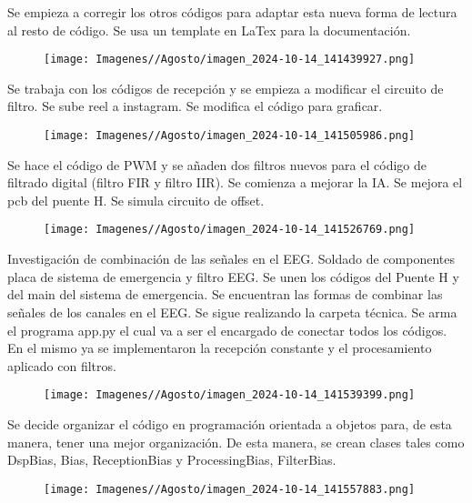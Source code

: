 \documentclass{article}
\begin{document}
\newpage
Se empieza a corregir los otros códigos para adaptar esta nueva forma de lectura al resto de código. Se usa un template en LaTex para la documentación.

\begin{figure}[H]
    \centering
    \texttt{[image: Imagenes//Agosto/imagen\_2024-10-14\_141439927.png]}
\end{figure}

Se trabaja con los códigos de recepción y se empieza a modificar el circuito de filtro. Se sube reel a instagram. Se modifica el código para graficar.

\begin{figure}[H]
    \centering
    \texttt{[image: Imagenes//Agosto/imagen\_2024-10-14\_141505986.png]}
\end{figure}

\newpage
Se hace el código de PWM y se añaden dos filtros nuevos para el código de filtrado digital (filtro FIR y filtro IIR). Se comienza a mejorar la IA. Se mejora el pcb del puente H. Se simula circuito de offset.

\begin{figure}[H]
    \centering
    \texttt{[image: Imagenes//Agosto/imagen\_2024-10-14\_141526769.png]}
\end{figure}

Investigación de combinación de las señales en el EEG. Soldado de componentes placa de sistema de emergencia y filtro EEG. Se unen los códigos del Puente H y del main del sistema de emergencia. Se encuentran las formas de combinar las señales de los canales en el EEG. Se sigue realizando la carpeta técnica. Se arma el programa app.py el cual va a ser el encargado de conectar todos los códigos. En el mismo ya se implementaron la recepción constante y el procesamiento aplicado con filtros.

\begin{figure}[H]
    \centering
    \texttt{[image: Imagenes//Agosto/imagen\_2024-10-14\_141539399.png]}
\end{figure}

\newpage
Se decide organizar el código en programación orientada a objetos para, de esta manera, tener una mejor organización. De esta manera, se crean clases tales como DspBias, Bias, ReceptionBias y ProcessingBias, FilterBias.

\begin{figure}[H]
    \centering
    \texttt{[image: Imagenes//Agosto/imagen\_2024-10-14\_141557883.png]}
\end{figure}
\end{document}
